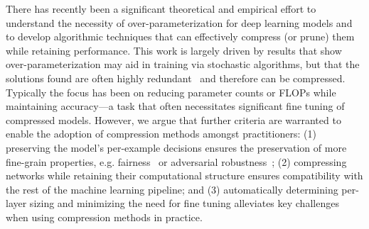 There has recently been a significant theoretical and empirical effort to understand the necessity of over-parameterization for deep learning models and to develop algorithmic techniques that can effectively compress (or prune) them while retaining performance. 
This work is largely driven by results that show over-parameterization may aid in training via stochastic algorithms, but that the solutions found are often highly redundant~\cite{frankle2018lottery,frankle2020linear,jaderberg2014speeding,luo2017thinet} and therefore can be compressed. 
Typically the focus has been on reducing parameter counts or FLOPs while maintaining accuracy---a task that often necessitates significant fine tuning of compressed models. However, we argue that further criteria are warranted to enable the adoption of compression methods amongst practitioners: 
(1) preserving the model's per-example decisions ensures the preservation of more fine-grain properties, e.g. 
fairness~\cite{barocas-hardt-narayanan,rothfair,goel2018fair,roth2019fair,aram2021fair} or adversarial robustness~\cite{carlini2019evaluating,liang2019adversarial,kolter2019adversarial,hein2020adversarial,silva2020adversarial};
(2) compressing networks while retaining their computational structure ensures compatibility with the rest of the machine learning pipeline; and 
(3) automatically determining per-layer sizing and minimizing the need for fine tuning alleviates key challenges when using compression methods in practice.



